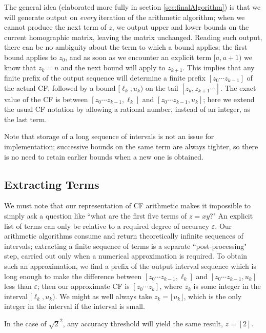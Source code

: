 \documentclass[11pt, oneside]{amsart}   	%
\begin{document}
The general idea (elaborated more fully in section \ref{sec:finalAlgorithm}) is that we will generate output on \emph{every}
 iteration of the arithmetic algorithm; when we cannot produce the next term of $z$, we output upper and lower bounds on the current
 homographic matrix, leaving the matrix unchanged. Reading such output, there can be no ambiguity about the term to which a bound 
 applies; the first bound applies to $z_0$, and as soon as we encounter an explicit term $[a,a+1)$ we know that $z_k=n$ and the next bound will apply to $z_{k+1}$. 
 This implies that any finite prefix of the output sequence will determine a finite prefix $[z_0 \cdots z_{k-1}]$ of the actual CF, followed by a bound
 $[\ell_k,u_k)$ on the tail $[z_k, z_{k+1}\cdots]$. The exact value of the CF is between $[z_0 \cdots z_{k-1}, \ell_k]$ and
 $[z_0 \cdots z_{k-1}, u_k]$; here we extend the usual CF notation by allowing a rational number, instead of an integer, as the last term.

Note that storage of a long sequence of intervals is not an issue for implementation;
successive bounds on the same term are always tighter, so there is no need to retain earlier bounds when a new one is obtained. 

\subsection{Extracting Terms}
We must note that our representation of CF arithmetic makes it impossible to simply ask a question like ``what are the first
five terms of $z = xy$?" An explicit list of terms can only be relative to a required degree of accuracy $\varepsilon$. Our arithmetic
algorithms consume and return theoretically infinite sequences of intervals; extracting a finite sequence of terms is a separate
``post-processing" step, carried out only when a numerical approximation is required.
To obtain such an approximation, we find a prefix of
the output interval sequence which is long enough to make the difference between $[z_0 \cdots z_{k-1}, \ell_k]$ and $[z_0 \cdots
z_{k-1}, u_k]$ less than $\varepsilon$; then our approximate CF is $[z_0 \cdots z_k]$, where $z_k$ is some integer in the interval
$[\ell_k,u_k)$. We might as well always take $z_k = \lfloor u_k \rfloor$, which is the only integer in the interval if the interval is small. 

In the case of $\sqrt{2}^2$, any accuracy threshold will yield the same result, $z = [2]$.
\end{document}
